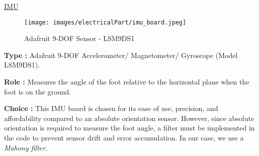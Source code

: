 \documentclass[lettersize,journal]{IEEEtran}
\begin{document}



\bigskip

\noindent \underline{IMU}

\begin{figure}[!h]
    \centering
    \texttt{[image: images/electricalPart/imu\_board.jpeg]}
    \caption{\centering Adafruit 9-DOF Sensor - LSM9DS1}
    \label{fig:IMU}
\end{figure}



\noindent \textbf{Type :} Adafruit 9-DOF Accelerometer/ Magnetometer/ Gyroscope (Model LSM9DS1).

\medskip \noindent \textbf{Role :} Measures the angle of the foot relative to the horizontal plane when the foot is on the ground.


\medskip \noindent \textbf{Choice :}
This IMU board is chosen for its ease of use, precision, and affordability compared to an absolute orientation sensor. However, since absolute orientation is required to measure the foot angle, a filter must be implemented in the code to prevent sensor drift and error accumulation. In our case, we use a \textit{Mahony filter}.

\end{document}
